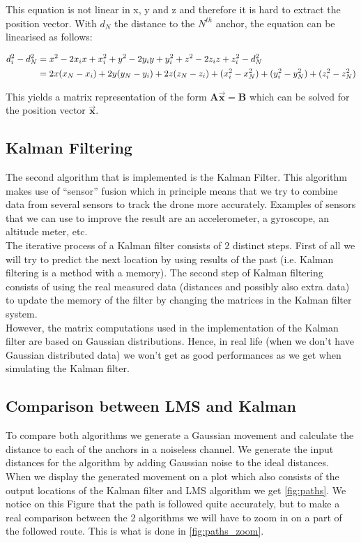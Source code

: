\documentclass[a4paper]{article}        %
\begin{document}
		This equation is not linear in x, y and z and therefore it is hard to extract the position vector. With $d_N$ the distance to the $N^{th}$ anchor, the equation can be linearised as follows:

		\begin{align*}
		\centering
			d_i^2 - d_N^2 &= x^2 - 2x_ix + x_i^2 + y^2 - 2y_iy + y_i^2 + z^2 - 2z_iz + z_i^2 - d_N^2 \\
				&= 2x(x_N - x_i) + 2y(y_N - y_i) + 2z(z_N- z_i)+ (x_i^2 - x_N^2) + (y_i^2 - y_N^2)  + (z_i^2 - z_N^2) 
		\end{align*}

		This yields a matrix representation of the form $\textbf{A}\vec{\textbf{x}} = \textbf{B}$ which can be solved for the position vector $\vec{\textbf{x}}$.


	\subsection{Kalman Filtering}
	The second algorithm that is implemented is the Kalman Filter. This algorithm makes use of ``sensor'' fusion which in principle means that we try to combine data from several sensors to track the drone more accurately.
	Examples of sensors that we can use to improve the result are an accelerometer, a gyroscope, an altitude meter, etc.\\
	The iterative process of a Kalman filter consists of 2 distinct steps. First of all we will try to predict the next location by using results of the past (i.e. Kalman filtering is a method with a memory). 
	The second step of Kalman filtering consists of using the real measured data (distances and possibly also extra data) to update the memory of the filter by changing the matrices in the Kalman filter system.\\
	However, the matrix computations used in the implementation of the Kalman filter are based on Gaussian distributions. Hence, in real life (when we don't have Gaussian distributed data) we won't get as good performances as we get when simulating the Kalman filter.
	
\subsection{Comparison between LMS and Kalman}

To compare both algorithms we generate a Gaussian movement and calculate the distance to each of the anchors in a noiseless channel. We generate the input distances for the algorithm by adding Gaussian noise to the ideal distances.
When we display the generated movement on a plot which also consists of the output locations of the Kalman filter and LMS algorithm we get \autoref{fig:paths}.
We notice on this Figure that the path is followed quite accurately, but to make a real comparison between the 2 algorithms we will have to zoom in on a part of the followed route. This is what is done in \autoref{fig:paths_zoom}.	
\end{document}
